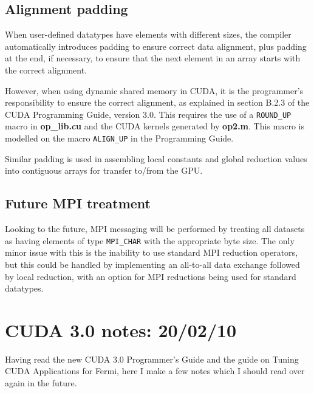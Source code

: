 \documentclass[12pt]{article}
\begin{document}
\subsection{Alignment padding}

When user-defined datatypes have elements with different sizes, the 
compiler automatically introduces padding to ensure correct data 
alignment, plus padding at the end, if necessary, to ensure that 
the next element in an array starts with the correct alignment.

However, when using dynamic shared memory in CUDA, it is the 
programmer's responsibility to ensure the correct alignment, as 
explained in section B.2.3 of the CUDA Programming Guide, version 3.0.
This requires the use of a {\tt ROUND\_UP} macro in {\bf op\_lib.cu}
and the CUDA kernels generated by {\bf op2.m}.  This macro is
modelled on the macro {\tt ALIGN\_UP} in the Programming Guide.

Similar padding is used in assembling local constants and global
reduction values into contiguous arrays for transfer to/from the GPU. 

\subsection{Future MPI treatment}

Looking to the future, MPI messaging will be performed by treating all 
datasets as having elements of type {\tt MPI\_CHAR} with the appropriate
byte size.  The only minor issue with this is the inability to use 
standard MPI reduction operators, but this could be handled by
implementing an all-to-all data exchange followed by local reduction,
with an option for MPI reductions being used for standard datatypes.



\section{CUDA 3.0 notes: 20/02/10}

Having read the new CUDA 3.0 Programmer's Guide and the guide on
Tuning CUDA Applications for Fermi, here I make a few notes which 
I should read over again in the future.
\end{document}
